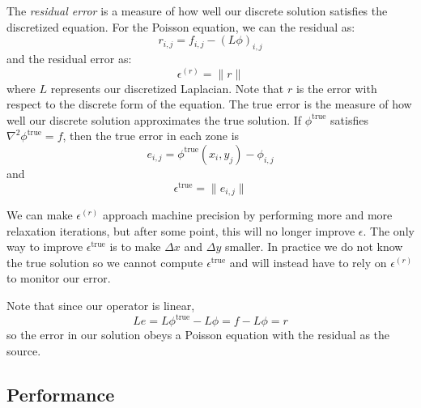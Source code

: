 The {\em residual error} is a measure of how well our discrete solution
satisfies the discretized equation.  For the Poisson equation, we
can the residual as:
\begin{equation}
r_{i,j} = f_{i,j} - (L \phi)_{i,j} 
\end{equation}
and the residual error as:
\begin{equation}
\epsilon^{(r)} = \| r \|
\end{equation}
where $L$ represents our discretized Laplacian.  Note that $r$ is the
error with respect to the discrete form of the equation.  The true
error is the measure of how well our discrete solution approximates
the true solution.  If $\phi^\mathrm{true}$ satisfies $\nabla^2
\phi^\mathrm{true} = f$, then the true error in each zone is
\begin{equation}
e_{i,j} = \phi^\mathrm{true}(x_i,y_j) - \phi_{i,j} 
\end{equation}
and
\begin{equation}
\epsilon^\mathrm{true} = \| e_{i,j} \|
\end{equation}

We can make $\epsilon^{(r)}$ approach machine precision by performing
more and more relaxation iterations, but after some point, this will
no longer improve $\epsilon$.  The only way to improve
$\epsilon^\mathrm{true}$ is to make $\Delta x$ and $\Delta y$ smaller.
In practice we do not know the true solution so we cannot compute
$\epsilon^\mathrm{true}$ and will instead have to rely on
$\epsilon^{(r)}$ to monitor our error.

Note that since our operator is linear,
\begin{equation}
L e = L\phi^\mathrm{true} - L\phi = f - L\phi = r
\end{equation}
so the error in our solution obeys a Poisson equation with the residual
as the source.

\subsection{Performance}


